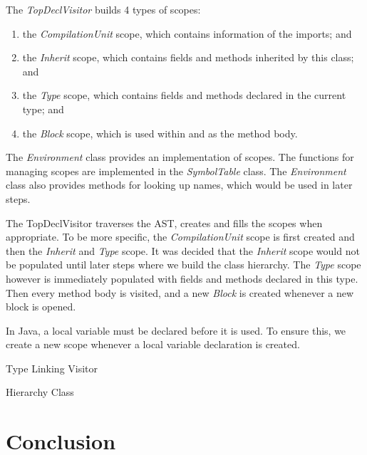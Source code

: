 \documentclass[a4paper, notitlepage]{report}
\begin{document}
The \emph{TopDeclVisitor} builds 4 types of scopes: 
\begin{enumerate}
\item the \emph{CompilationUnit} scope, which contains information of the imports; and
\item the \emph{Inherit} scope, which contains fields and methods inherited by this class; and
\item the \emph{Type} scope, which contains fields and methods declared in the current type; and
\item the \emph{Block} scope, which is used within and as the method body.

\end{enumerate}

The \emph{Environment} class provides an implementation of scopes. The functions for managing scopes are implemented in the \emph{SymbolTable} class. The \emph{Environment} class also provides methods for looking up names, which would be used in later steps.

The TopDeclVisitor traverses the AST, creates and fills the scopes when appropriate. To be more specific, the \emph{CompilationUnit} scope is first created and then the \emph{Inherit} and \emph{Type} scope. It was decided that the \emph{Inherit} scope would not be populated until later steps where we build the class hierarchy. The \emph{Type} scope however is immediately populated with fields and methods declared in this type. Then every method body is visited, and a new \emph{Block} is created whenever a new block is opened. 

In Java, a local variable must be declared before it is used. To ensure this, we create a new scope whenever a local variable declaration is created.



Type Linking Visitor

Hierarchy Class




\chapter{Conclusion}



\end{document}
